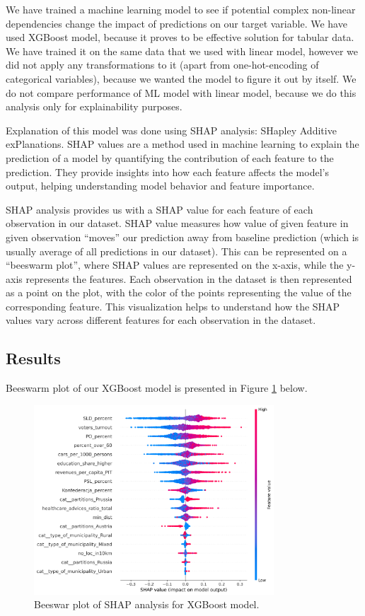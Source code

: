 \documentclass[a4paper,12pt]{article} %
\begin{document}
We have trained a machine learning model to see if potential complex non-linear dependencies change the impact of predictions on our target variable. We have used XGBoost model, because it proves to be effective solution for tabular data. \cite{10.1145/2939672.2939785} We have trained it on the same data that we used with linear model, however we did not apply any transformations to it (apart from one-hot-encoding of categorical variables), because we wanted the model to figure it out by itself. We do not compare performance of ML model with linear model, because we do this analysis only for explainability purposes. 

Explanation of this model was done using SHAP analysis: SHapley Additive exPlanations. SHAP values are a method used in machine learning to explain the prediction of a model by quantifying the contribution of each feature to the prediction. They provide insights into how each feature affects the model's output, helping understanding model behavior and feature importance. \cite{Lundberg2017AUA}

SHAP analysis provides us with a SHAP value for each feature of each observation in our dataset. SHAP value measures how value of given feature in given observation “moves” our prediction away from baseline prediction (which is usually average of all predictions in our dataset). This can be represented on a “beeswarm plot”, where SHAP values are represented on the x-axis, while the y-axis represents the features. Each observation in the dataset is then represented as a point on the plot, with the color of the points representing the value of the corresponding feature. This visualization helps to understand how the SHAP values vary across different features for each observation in the dataset.


\newpage
\subsection{Results}
Beeswarm plot of our XGBoost model is presented in Figure \ref{fig:beeswarm} below.
\begin{figure}[htbp]
    \centering
    \includegraphics[width=0.8\textwidth]{assets/beeswarm.png}
    \caption{Beeswar plot of SHAP analysis for XGBoost model.}
    \label{fig:beeswarm}
  \end{figure}
\end{document}
